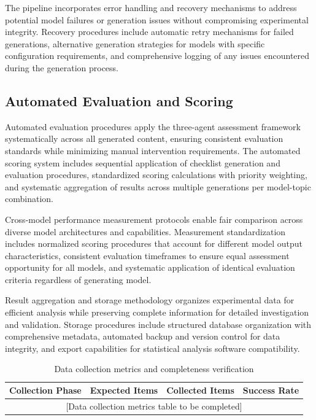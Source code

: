 The pipeline incorporates error handling and recovery mechanisms to address potential model failures or generation issues without compromising experimental integrity. Recovery procedures include automatic retry mechanisms for failed generations, alternative generation strategies for models with specific configuration requirements, and comprehensive logging of any issues encountered during the generation process.

\subsection{Automated Evaluation and Scoring}

Automated evaluation procedures apply the three-agent assessment framework systematically across all generated content, ensuring consistent evaluation standards while minimizing manual intervention requirements. The automated scoring system includes sequential application of checklist generation and evaluation procedures, standardized scoring calculations with priority weighting, and systematic aggregation of results across multiple generations per model-topic combination.

Cross-model performance measurement protocols enable fair comparison across diverse model architectures and capabilities. Measurement standardization includes normalized scoring procedures that account for different model output characteristics, consistent evaluation timeframes to ensure equal assessment opportunity for all models, and systematic application of identical evaluation criteria regardless of generating model.

Result aggregation and storage methodology organizes experimental data for efficient analysis while preserving complete information for detailed investigation and validation. Storage procedures include structured database organization with comprehensive metadata, automated backup and version control for data integrity, and export capabilities for statistical analysis software compatibility.

\begin{table}[htbp]
    \centering
    \caption{Data collection metrics and completeness verification}
    \label{tab:data-collection-metrics}
    \begin{tabular}{|l|c|c|c|}
    \hline
    \textbf{Collection Phase} & \textbf{Expected Items} & \textbf{Collected Items} & \textbf{Success Rate} \\
    \hline
    \multicolumn{4}{|c|}{[Data collection metrics table to be completed]} \\
    \hline
    \end{tabular}
\end{table}

